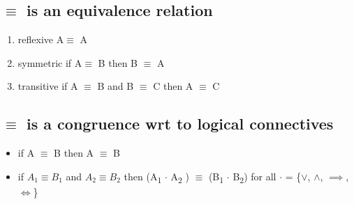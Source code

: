 \documentclass[11pt]{article}
\begin{document}
\subsection{\(\equiv\) is an equivalence relation}
\label{sec:orgf62762c}
\begin{enumerate}
\item reflexive A\(\equiv\) A
\item symmetric if A\(\equiv\) B then B \(\equiv\) A
\item transitive if A \(\equiv\) B and B \(\equiv\) C then A \(\equiv\) C
\end{enumerate}
\subsection{\(\equiv\) is a congruence wrt to logical connectives}
\label{sec:org76c6592}
\begin{itemize}
\item if A \(\equiv\) B then \textlnot{} A \(\equiv\) \textlnot{} B \\
\item if \(A_1 \equiv B_1\) and \(A_2 \equiv B_2\) then (A\textsubscript{1} \(\cdot\) A\textsubscript{2} ) \(\equiv\) (B\textsubscript{1} \(\cdot\) B\textsubscript{2}) for all \(\cdot\) = \{\(\lor\), \(\land\), \(\implies\), \(\iff\)\}
\end{itemize}
\end{document}
